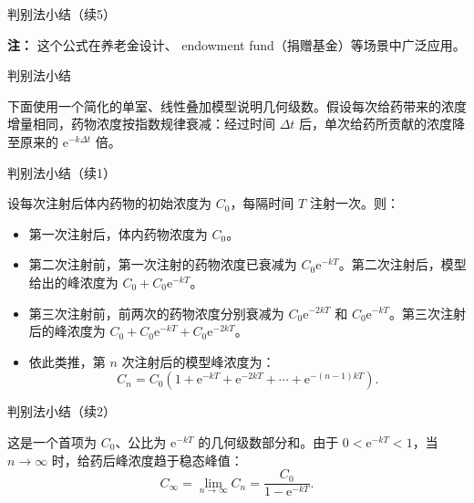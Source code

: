 \documentclass[aspectratio=169,10pt,fontset=fandol]{ctexbeamer}
\newcommand{\ee}{\mathrm{e}}
\begin{document}
\begin{frame}[t,fragile]{判别法小结（续5）}
\footnotesize
{\footnotesize
\begin{application}
\textbf{注：} 这个公式在养老金设计、 endowment fund（捐赠基金）等场景中广泛应用。
\end{application}
}
\end{frame}
\begin{frame}[t,fragile]{判别法小结}
\footnotesize
{\footnotesize
\begin{application}

下面使用一个简化的单室、线性叠加模型说明几何级数。假设每次给药带来的浓度增量相同，药物浓度按指数规律衰减：经过时间 \(\Delta t\) 后，单次给药所贡献的浓度降至原来的 \(\ee^{-k\Delta t}\) 倍。


\end{application}
}
\end{frame}
\begin{frame}[t,fragile]{判别法小结（续1）}
\footnotesize
{\footnotesize
\begin{application}
设每次注射后体内药物的初始浓度为 \(C_0\)，每隔时间 \(T\) 注射一次。则：
\begin{itemize}
\item 第一次注射后，体内药物浓度为 \(C_0\)。
\item 第二次注射前，第一次注射的药物浓度已衰减为 \(C_0\ee^{-kT}\)。第二次注射后，模型给出的峰浓度为 \(C_0+C_0\ee^{-kT}\)。
\item 第三次注射前，前两次的药物浓度分别衰减为 \(C_0\ee^{-2kT}\) 和 \(C_0\ee^{-kT}\)。第三次注射后的峰浓度为 \(C_0+C_0\ee^{-kT}+C_0\ee^{-2kT}\)。
\item 依此类推，第 \(n\) 次注射后的模型峰浓度为：
\[
C_n=C_0\left(1+\ee^{-kT}+\ee^{-2kT}+\cdots+\ee^{-(n-1)kT}\right).
\]
\end{itemize}


\end{application}
}
\end{frame}
\begin{frame}[t,fragile]{判别法小结（续2）}
\footnotesize
{\footnotesize
\begin{application}
这是一个首项为 \(C_0\)、公比为 \(\ee^{-kT}\) 的几何级数部分和。由于 \(0<\ee^{-kT}<1\)，当 \(n\to\infty\) 时，给药后峰浓度趋于稳态峰值：
\[
C_{\infty}=\lim_{n\to\infty}C_n=\frac{C_0}{1-\ee^{-kT}}.
\]


\end{application}
}
\end{frame}
\end{document}
